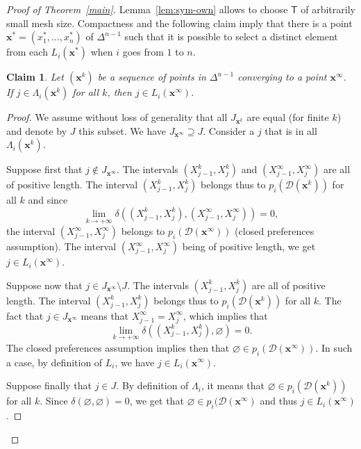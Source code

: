 \documentclass[12pt]{amsart}
\newtheorem*{claim}{Claim}
\theoremstyle{definition}
\theoremstyle{remark}
\def\D{\mathcal{D}}
\def\T{\mathsf{T}}
\def\xx{\boldsymbol{x}}
\begin{document}
\begin{proof}[Proof of Theorem~\ref{main}]
Lemma~\ref{lem:sym-own} allows to choose $\T$ of arbitrarily small mesh size. Compactness and the following claim imply that there is a point $\xx^*=(x_1^*,\ldots,x_n^*)$ of $\Delta^{n-1}$ such that it is possible to select a distinct element from each $L_i(\xx^*)$ when $i$ goes from $1$ to $n$. 

\begin{claim}
Let $(\xx^k)$ be a sequence of points in $\Delta^{n-1}$ converging to a point $\xx^{\infty}$. If $j\in\Lambda_i(\xx^k)$ for all $k$, then $j\in L_i(\xx^{\infty})$.
\end{claim}

\begin{proof}

We assume without loss of generality that all $J_{\xx^k}$ are equal (for finite $k$) and denote by $J$ this subset. We have $J_{\xx^{\infty}}\supseteq J$. Consider a $j$ that is in all $\Lambda_i(\xx^k)$.

Suppose first that $j\notin J_{\xx^{\infty}}$. The intervals $(X_{j-1}^k,X_j^k)$ and $(X_{j-1}^{\infty},X_j^{\infty})$ are all of positive length. The interval $(X_{j-1}^k,X_j^k)$ belongs thus to $p_i(\D(\xx^k))$ for all $k$ and since $$\lim_{k\rightarrow+\infty}\delta\left((X_{j-1}^k,X_j^k),(X_{j-1}^{\infty},X_j^{\infty})\right)=0,$$ the interval $(X_{j-1}^{\infty},X_j^{\infty})$ belongs to $p_i(\D(\xx^{\infty}))$ (closed preferences assumption). The interval $(X_{j-1}^{\infty},X_j^{\infty})$ being of positive length, we get $j\in L_i(\xx^{\infty})$.

Suppose now that $j\in J_{\xx^{\infty}}\setminus J$. The intervals $(X_{j-1}^k,X_j^k)$ are all of positive length. The interval $(X_{j-1}^k,X_j^k)$ belongs thus to $p_i(\D(\xx^k))$ for all $k$. The fact that $j\in J_{\xx^{\infty}}$ means that $X_{j-1}^{\infty}=X_j^{\infty}$, which implies that 
$$\lim_{k\rightarrow+\infty}\delta\left((X_{j-1}^k,X_j^k),\varnothing\right)=0.$$ The closed preferences assumption implies then that $\varnothing\in p_i(\D(\xx^{\infty}))$. In such a case, by definition of $L_i$, we have $j\in L_i(\xx^{\infty})$.

Suppose finally that $j\in J$. By definition of $\Lambda_i$, it means that $\varnothing\in p_i(\D(\xx^k))$ for all $k$. Since $\delta(\varnothing,\varnothing)=0$, we get that $\varnothing\in p_i(\D(\xx^{\infty})$ and thus $j\in L_i(\xx^{\infty})$.
\end{proof}


\end{proof}
\end{document}
